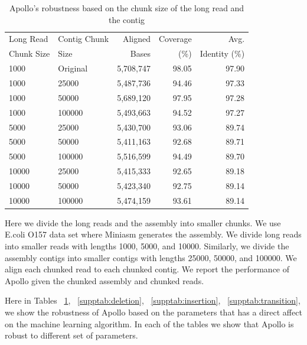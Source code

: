 \documentclass[a4paper]{article}
\begin{document}
\begin{table}[htb]
\begin{center}
\caption{Apollo's robustness based on the chunk size of the long read and the contig}
\label{supptab:chunk}
\begin{tabular}{|l|l|rrr|}
\hline Long Read & Contig Chunk & Aligned & Coverage & Avg.\\
Chunk Size & Size & Bases & (\%) & Identity (\%) \\\hline
1000  & Original & 5,708,747 & 98.05 & 97.90 \\%
1000  & 25000 & 5,487,736 & 94.46 & 97.33 \\%
1000  & 50000 & 5,689,120 & 97.95 & 97.28 \\%
1000  & 100000 & 5,493,663 & 94.52 & 97.27 \\%
5000  & 25000 & 5,430,700 & 93.06 & 89.74 \\%
5000  & 50000 & 5,411,163 & 92.68 & 89.71 \\%
5000  & 100000 & 5,516,599 & 94.49 & 89.70 \\%
10000  & 25000 & 5,415,333 & 92.65 & 89.18 \\%
10000  & 50000 & 5,423,340 & 92.75 & 89.14 \\%
10000  & 100000 & 5,474,159 & 93.61 & 89.14 \\\hline
\end{tabular}
\end{center}
{\small Here we divide the long reads and the assembly into smaller chunks. We use E.coli O157 data set where Miniasm generates the assembly. We divide long reads into smaller reads with lengths 1000, 5000, and 10000. Similarly, we divide the assembly contigs into smaller contigs with lengths 25000, 50000, and 100000. We align each chunked read to each chunked contig. We report the performance of Apollo given the chunked assembly and chunked reads.}
\end{table}

Here in Tables ~\ref{supptab:chunk}, ~\ref{supptab:deletion}, ~\ref{supptab:insertion}, ~\ref{supptab:transition}, we show the robustness of Apollo based on the parameters that has a direct affect on the machine learning algorithm. In each of the tables we show that Apollo is robust to different set of parameters.
\end{document}
